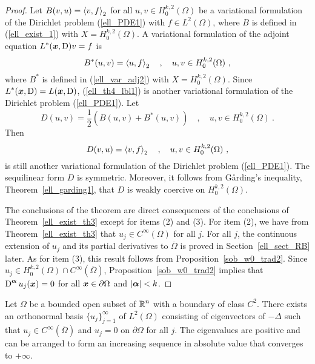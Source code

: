 \begin{proof}
Let $\displaystyle B(v,u) = \left\langle{v} , {f}\right\rangle_2$ for all
$\displaystyle u, v \in H^{k,2}_0(\Omega)$
be a variational formulation of the Dirichlet problem (\ref{ell_PDE1})
with $\displaystyle f\in L^2(\Omega)$, where $B$ is defined in
(\ref{ell_exist_1}) with $\displaystyle X=H^{k,2}_0(\Omega)$.  A
variational formulation of the adjoint equation
$\displaystyle L^\ast({\bm{x}},\operatorname{D})v = f$ is
\begin{equation} \label{ell_th4_lbl1}
B^\ast(u,v) = \ps{u}{f}_2 \quad , \quad u,v \in H^{k,2}_0(\Omega) \ ,
\end{equation}
where $\displaystyle B^\ast$ is defined in (\ref{ell_var_adj2}) with
$\displaystyle X=H^{k,2}_0(\Omega)$. Since
$\displaystyle L^\ast({\bm{x}},\operatorname{D})=L({\bm{x}},\operatorname{D})$,
(\ref{ell_th4_lbl1}) is another variational formulation of the
Dirichlet problem (\ref{ell_PDE1}).  Let
\[
D(u,v) = \frac{1}{2} \left( B(u,v) + B^\ast(u,v) \right)
\quad , \quad u,v \in H^{k,2}_0(\Omega) \ .
\]
Then
\[
D(v,u) = \left\langle{v} , {f}\right\rangle_2 \quad , \quad u,v \in H^{k,2}_0(\Omega) \ ,
\]
is still another variational formulation of the Dirichlet problem
(\ref{ell_PDE1}).  The sequilinear form $D$ is symmetric.  Moreover, 
it follows from G\r{a}rding's inequality,
Theorem~\ref{ell_garding1}, that $D$ is weakly coercive on
$\displaystyle H^{k,2}_0(\Omega)$.

The conclusions of the theorem are direct consequences of the
conclusions of Theorem~\ref{ell_exist_th3} except for items
(2) and (3).  For item (2), we have from
Theorem~\ref{ell_exist_th3} that
$\displaystyle u_j \in C^\infty(\Omega)$ for all $j$.
For all $j$, the continuous extension of $u_j$ and its partial
derivatives to $\overline{\Omega}$ is proved in
Section~\ref{ell_sect_RB} later.  As for item (3), this result
follows from Proposition~\ref{sob_w0_trad2}.
Since $\displaystyle u_j \in H^{k,2}_0(\Omega) \cap C^\infty(\overline{\Omega})$,
Proposition~\ref{sob_w0_trad2} implies that
$\displaystyle \operatorname{D}^{{\bm{\alpha}}} u_j({\bm{x}}) = 0$ for all
${\bm{x}} \in \partial \Omega$ and $|{\bm{\alpha}}|<k$. 
\end{proof}

\begin{cor}
Let $\Omega$ be a bounded open subset of $\displaystyle \mathbb{R}^n$ with a
boundary of class $\displaystyle C^2$.  There exists an
orthonormal basis $\displaystyle \{u_j\}_{j=1}^\infty$ of
$\displaystyle L^2(\Omega)$ consisting
of eigenvectors of $-\Delta$ such that
$\displaystyle u_j \in C^\infty(\overline{\Omega})$ and
$u_j=0$ on $\partial \Omega$ for all $j$.  The eigenvalues are
positive and can be arranged to form an increasing sequence in
absolute value that converges to $+\infty$.
\end{cor}

